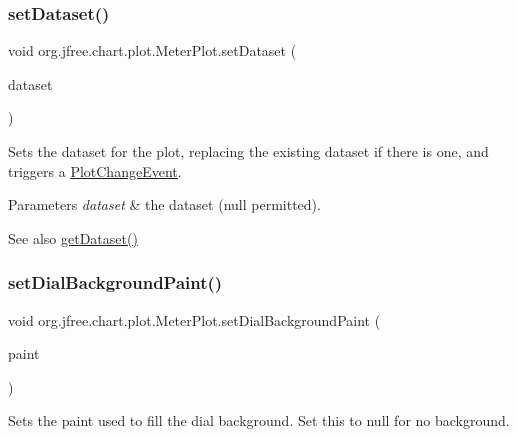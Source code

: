 \subsubsection{\texorpdfstring{set\+Dataset()}{setDataset()}}
{\footnotesize\ttfamily void org.\+jfree.\+chart.\+plot.\+Meter\+Plot.\+set\+Dataset (\begin{DoxyParamCaption}\item[{\mbox{\hyperlink{interfaceorg_1_1jfree_1_1data_1_1general_1_1_value_dataset}{Value\+Dataset}}}]{dataset }\end{DoxyParamCaption})}

Sets the dataset for the plot, replacing the existing dataset if there is one, and triggers a \mbox{\hyperlink{}{Plot\+Change\+Event}}.


\begin{DoxyParams}{Parameters}
{\em dataset} & the dataset ({\ttfamily null} permitted).\\
\hline
\end{DoxyParams}
\begin{DoxySeeAlso}{See also}
\mbox{\hyperlink{classorg_1_1jfree_1_1chart_1_1plot_1_1_meter_plot_a01224156fe73c19bd13b3b4feb58e884}{get\+Dataset()}} 
\end{DoxySeeAlso}
\mbox{\label{classorg_1_1jfree_1_1chart_1_1plot_1_1_meter_plot_aecab997e41adbba2f37c6da45a1745f0}} 
\subsubsection{\texorpdfstring{set\+Dial\+Background\+Paint()}{setDialBackgroundPaint()}}
{\footnotesize\ttfamily void org.\+jfree.\+chart.\+plot.\+Meter\+Plot.\+set\+Dial\+Background\+Paint (\begin{DoxyParamCaption}\item[{Paint}]{paint }\end{DoxyParamCaption})}

Sets the paint used to fill the dial background. Set this to {\ttfamily null} for no background.


